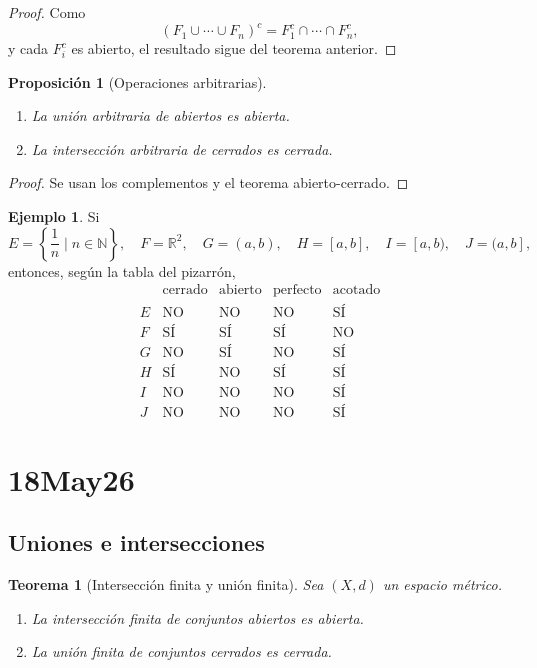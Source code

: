 \documentclass[12pt]{article}
\theoremstyle{definition}
\newtheorem{example}[definition]{Ejemplo}
\theoremstyle{plain}
\newtheorem{theorem}[definition]{Teorema}
\newtheorem{proposition}[definition]{Proposición}
\theoremstyle{remark}
\begin{document}
\begin{proof}
Como
\[
(F_1\cup\cdots\cup F_n)^c=F_1^c\cap\cdots\cap F_n^c,
\]
y cada $F_i^c$ es abierto, el resultado sigue del teorema anterior.
\end{proof}

\begin{proposition}[Operaciones arbitrarias]
\begin{enumerate}[label=\arabic*.]
    \item La unión arbitraria de abiertos es abierta.
    \item La intersección arbitraria de cerrados es cerrada.
\end{enumerate}
\end{proposition}

\begin{proof}
Se usan los complementos y el teorema abierto-cerrado.
\end{proof}

\begin{example}
Si
\[
E=\left\{\frac1n\mid n\in\mathbb N\right\},\quad
F=\mathbb R^2,\quad
G=(a,b),\quad
H=[a,b],\quad
I=[a,b),\quad
J=(a,b],
\]
entonces, según la tabla del pizarrón,
\[
\begin{array}{c|cccc}
 & \text{cerrado} & \text{abierto} & \text{perfecto} & \text{acotado}\\
\hline
E & \text{NO} & \text{NO} & \text{NO} & \text{SÍ}\\
F & \text{SÍ} & \text{SÍ} & \text{SÍ} & \text{NO}\\
G & \text{NO} & \text{SÍ} & \text{NO} & \text{SÍ}\\
H & \text{SÍ} & \text{NO} & \text{SÍ} & \text{SÍ}\\
I & \text{NO} & \text{NO} & \text{NO} & \text{SÍ}\\
J & \text{NO} & \text{NO} & \text{NO} & \text{SÍ}
\end{array}
\]
\end{example}

\section*{18May26}

\subsection*{Uniones e intersecciones}

\begin{theorem}[Intersección finita y unión finita]
Sea $(X,d)$ un espacio métrico.
\begin{enumerate}[label=\alph*.]
    \item La intersección finita de conjuntos abiertos es abierta.
    \item La unión finita de conjuntos cerrados es cerrada.
\end{enumerate}
\end{theorem}
\end{document}
